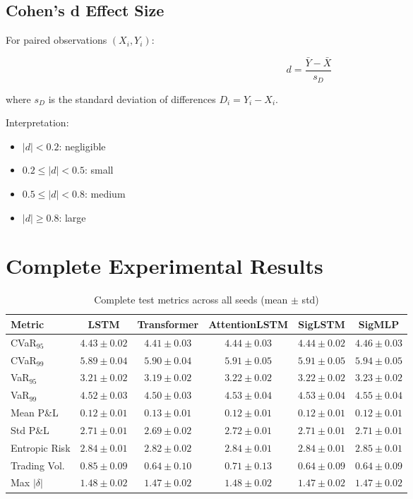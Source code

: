 \subsection{Cohen's d Effect Size}

For paired observations $(X_i, Y_i)$:

\begin{equation}
    d = \frac{\bar{Y} - \bar{X}}{s_D}
\end{equation}

where $s_D$ is the standard deviation of differences $D_i = Y_i - X_i$.

Interpretation:
\begin{itemize}
    \item $|d| < 0.2$: negligible
    \item $0.2 \leq |d| < 0.5$: small
    \item $0.5 \leq |d| < 0.8$: medium
    \item $|d| \geq 0.8$: large
\end{itemize}

\section{Complete Experimental Results}
\label{app:full_results}

\begin{table}[h]
\centering
\caption{Complete test metrics across all seeds (mean $\pm$ std)}
\label{tab:full_results}
\begin{tabular}{lccccc}
\toprule
\textbf{Metric} & \textbf{LSTM} & \textbf{Transformer} & \textbf{AttentionLSTM} & \textbf{SigLSTM} & \textbf{SigMLP} \\
\midrule
CVaR$_{95}$ & $4.43 \pm 0.02$ & $4.41 \pm 0.03$ & $4.44 \pm 0.03$ & $4.44 \pm 0.02$ & $4.46 \pm 0.03$ \\
CVaR$_{99}$ & $5.89 \pm 0.04$ & $5.90 \pm 0.04$ & $5.91 \pm 0.05$ & $5.91 \pm 0.05$ & $5.94 \pm 0.05$ \\
VaR$_{95}$ & $3.21 \pm 0.02$ & $3.19 \pm 0.02$ & $3.22 \pm 0.02$ & $3.22 \pm 0.02$ & $3.23 \pm 0.02$ \\
VaR$_{99}$ & $4.52 \pm 0.03$ & $4.50 \pm 0.03$ & $4.53 \pm 0.04$ & $4.53 \pm 0.04$ & $4.55 \pm 0.04$ \\
Mean P\&L & $0.12 \pm 0.01$ & $0.13 \pm 0.01$ & $0.12 \pm 0.01$ & $0.12 \pm 0.01$ & $0.12 \pm 0.01$ \\
Std P\&L & $2.71 \pm 0.01$ & $2.69 \pm 0.02$ & $2.72 \pm 0.01$ & $2.71 \pm 0.01$ & $2.71 \pm 0.01$ \\
Entropic Risk & $2.84 \pm 0.01$ & $2.82 \pm 0.02$ & $2.84 \pm 0.01$ & $2.84 \pm 0.01$ & $2.85 \pm 0.01$ \\
Trading Vol. & $0.85 \pm 0.09$ & $0.64 \pm 0.10$ & $0.71 \pm 0.13$ & $0.64 \pm 0.09$ & $0.64 \pm 0.09$ \\
Max $|\delta|$ & $1.48 \pm 0.02$ & $1.47 \pm 0.02$ & $1.48 \pm 0.02$ & $1.47 \pm 0.02$ & $1.47 \pm 0.02$ \\
\bottomrule
\end{tabular}
\end{table}

